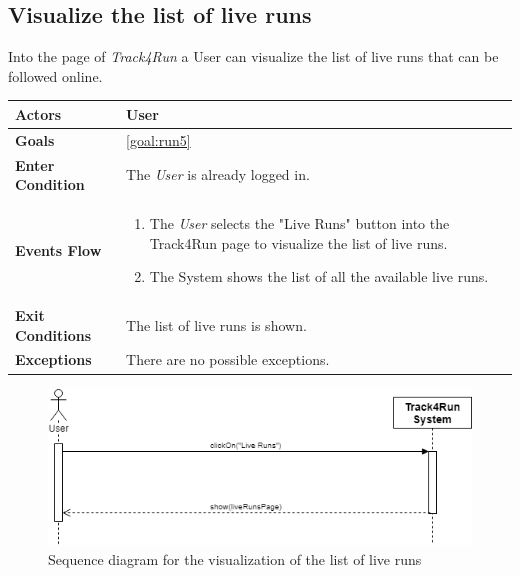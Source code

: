 \subsection{Visualize the list of live runs}
Into the page of \emph{Track4Run} a User can visualize the list of live runs that can be followed online.

\begin{table}[H]
	\centering
    
    \begin{tabular}{|p{3.5cm}|p{10.3cm}|}
    
    \hline
    \textbf{\large{Actors}}  			& \tabitem User 	\\
    				 					
    \hline
    \textbf{\large{Goals}} 				& \ref{goal:run5}\\
    
    \hline
    \textbf{\large{Enter Condition}}	& The \emph{User} is already logged in.		\\
    
    \hline
    \textbf{\large{Events Flow}}		& \begin{enumerate}[leftmargin=0.5cm]
                                          	\item The \emph{User} selects the "Live Runs" button into the Track4Run page to visualize the list of live runs.
                                          	 \item The System shows the list of all the available live runs.
                                          \end{enumerate}
    										\\
    \hline
    \textbf{\large{Exit Conditions}}    & The list of live runs is shown.\\
    
    \hline
    \textbf{\large{Exceptions}} 		& There are no possible exceptions.\\
    
    \hline
    
    
    \end{tabular}
	
\end{table}

\begin{figure}[H]
    \centering
    \includegraphics[scale=0.4]{Pictures/visListLiveRunsSeqDiag.png}
    \caption{Sequence diagram for the visualization of the list of live runs}
\end{figure}
